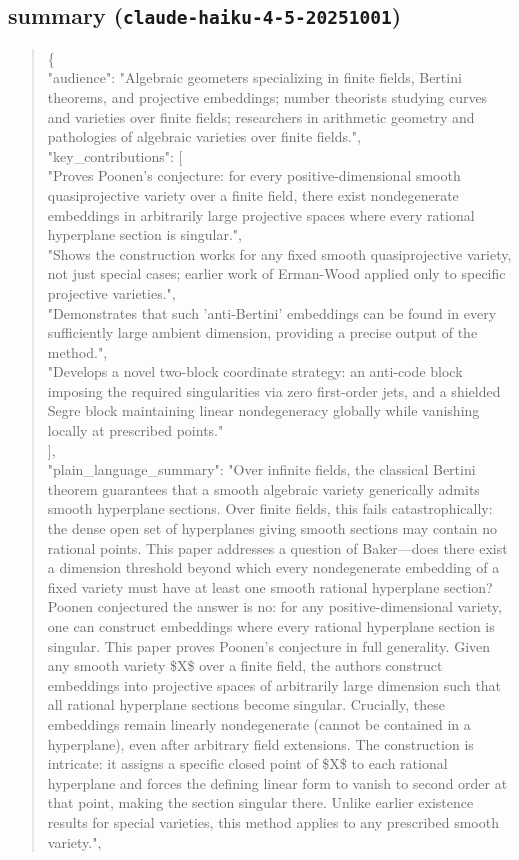 \documentclass[11pt]{article}
\begin{document}
\subsection*{summary (\texttt{claude-haiku-4-5-20251001})}
\begin{quote}\small\ttfamily\raggedright
\{\\
  "audience": "Algebraic geometers specializing in finite fields, Bertini theorems, and projective embeddings; number theorists studying curves and varieties over finite fields; researchers in arithmetic geometry and pathologies of algebraic varieties over finite fields.",\\
  "key\_contributions": [\\
    "Proves Poonen's conjecture: for every positive-dimensional smooth quasiprojective variety over a finite field, there exist nondegenerate embeddings in arbitrarily large projective spaces where every rational hyperplane section is singular.",\\
    "Shows the construction works for any fixed smooth quasiprojective variety, not just special cases; earlier work of Erman-Wood applied only to specific projective varieties.",\\
    "Demonstrates that such 'anti-Bertini' embeddings can be found in every sufficiently large ambient dimension, providing a precise output of the method.",\\
    "Develops a novel two-block coordinate strategy: an anti-code block imposing the required singularities via zero first-order jets, and a shielded Segre block maintaining linear nondegeneracy globally while vanishing locally at prescribed points."\\
  ],\\
  "plain\_language\_summary": "Over infinite fields, the classical Bertini theorem guarantees that a smooth algebraic variety generically admits smooth hyperplane sections. Over finite fields, this fails catastrophically: the dense open set of hyperplanes giving smooth sections may contain no rational points. This paper addresses a question of Baker---does there exist a dimension threshold beyond which every nondegenerate embedding of a fixed variety must have at least one smooth rational hyperplane section? Poonen conjectured the answer is no: for any positive-dimensional variety, one can construct embeddings where every rational hyperplane section is singular. This paper proves Poonen's conjecture in full generality. Given any smooth variety \$X\$ over a finite field, the authors construct embeddings into projective spaces of arbitrarily large dimension such that all rational hyperplane sections become singular. Crucially, these embeddings remain linearly nondegenerate (cannot be contained in a hyperplane), even after arbitrary field extensions. The construction is intricate: it assigns a specific closed point of \$X\$ to each rational hyperplane and forces the defining linear form to vanish to second order at that point, making the section singular there. Unlike earlier existence results for special varieties, this method applies to any prescribed smooth variety.",\\

\end{quote}
\end{document}
